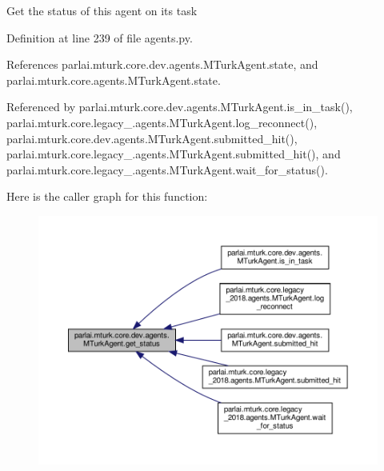 \begin{DoxyVerb}Get the status of this agent on its task\end{DoxyVerb}
 

Definition at line 239 of file agents.\+py.



References parlai.\+mturk.\+core.\+dev.\+agents.\+M\+Turk\+Agent.\+state, and parlai.\+mturk.\+core.\+agents.\+M\+Turk\+Agent.\+state.



Referenced by parlai.\+mturk.\+core.\+dev.\+agents.\+M\+Turk\+Agent.\+is\+\_\+in\+\_\+task(), parlai.\+mturk.\+core.\+legacy\+\_.\+agents.\+M\+Turk\+Agent.\+log\+\_\+reconnect(), parlai.\+mturk.\+core.\+dev.\+agents.\+M\+Turk\+Agent.\+submitted\+\_\+hit(), parlai.\+mturk.\+core.\+legacy\+\_.\+agents.\+M\+Turk\+Agent.\+submitted\+\_\+hit(), and parlai.\+mturk.\+core.\+legacy\+\_.\+agents.\+M\+Turk\+Agent.\+wait\+\_\+for\+\_\+status().

Here is the caller graph for this function\+:
\nopagebreak
\begin{figure}[H]
\begin{center}
\leavevmode
\includegraphics[width=350pt]{classparlai_1_1mturk_1_1core_1_1dev_1_1agents_1_1MTurkAgent_a2423bb27d86be375313b61a60a12be0d_icgraph}
\end{center}
\end{figure}
\mbox{\label{classparlai_1_1mturk_1_1core_1_1dev_1_1agents_1_1MTurkAgent_a07577b6f15ab8b64d2bd2aba87a5e011}} 
